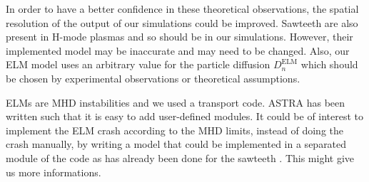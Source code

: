 In order to have a better confidence in these theoretical observations, the spatial resolution of the output of our simulations could be improved. Sawteeth are also present in H-mode plasmas and so should be in our simulations. However, their implemented model may be inaccurate and may need to be changed. Also, our ELM model uses an arbitrary value for the particle diffusion $D_n^{\textrm{ELM}}$ which should be chosen by experimental observations or theoretical assumptions.

ELMs are MHD instabilities and we used a transport code. ASTRA has been written such that it is easy to add user-defined modules. It could be of interest to implement the ELM crash according to the MHD limits, instead of doing the crash manually, by writing a model that could be implemented in a separated module of the code as has already been done for the sawteeth \cite{fableST}. This might give us more informations.
